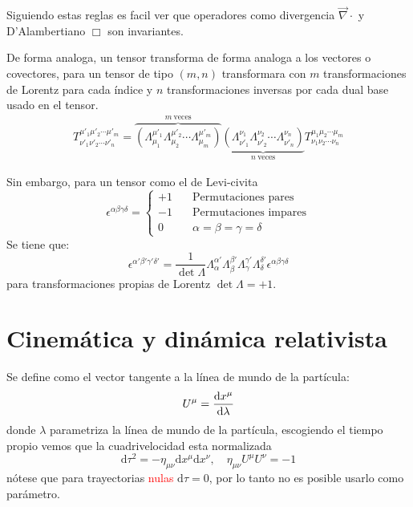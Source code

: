 \documentclass[../main]{subfiles}
\begin{document}
Siguiendo estas reglas es facil ver que operadores como divergencia $\vec{\nabla}\cdot$ y D'Alambertiano $\Box$ son invariantes.

De forma analoga, un tensor transforma de forma analoga a los vectores o covectores, para un tensor de tipo $(m, n)$ transformara con $m$ transformaciones de Lorentz para cada índice y $n$ transformaciones inversas por cada dual base usado en el tensor.
\begin{equation}
    \begin{split}
        T^{\mu'_1 \mu'_2 \cdots \mu'_m}_{\nu'_1 \nu'_2 \cdots \nu'_n}=\overbrace{\left(\Lambda^{\mu'_1}_{\mu_1} \Lambda^{\mu'_2}_{\mu_2}\cdots \Lambda^{\mu'_m}_{\mu_m}\right)}^{m \ \text{veces}} \underbrace{\left(\Lambda^{\nu_1}_{\nu'_1}\Lambda^{\nu_2}_{\nu'_2}\cdots \Lambda^{\nu_n}_{\nu'_n}\right)}_{n \ \text{veces}} T^{\mu_1\mu_2 \cdots \mu_m}_{\nu_1\nu_2\cdots \nu_n}
    \end{split}
\end{equation}

Sin embargo, para un tensor como el de Levi-civita
\begin{equation}
    \epsilon^{\alpha\beta\gamma\delta}=
    \left\{
    \begin{split}
        +1 &\quad \text{Permutaciones pares}\\
        -1 &\quad \text{Permutaciones impares}\\
        0  &\quad \alpha=\beta=\gamma=\delta
    \end{split}
    \right.
\end{equation}
Se tiene que:
\begin{equation}
    \epsilon^{\alpha' \beta' \gamma' \delta'}=\dfrac{1}{\det \Lambda} \Lambda^{\alpha'}_{\alpha} \Lambda^{\beta'}_{\beta} \Lambda^{\gamma'}_{\gamma} \Lambda^{\delta'}_{\delta}\epsilon^{\alpha\beta\gamma\delta}
\end{equation}
para transformaciones propias de Lorentz $\det \Lambda=+1$.

\section{Cinemática y dinámica relativista}
 Se define como el vector tangente a la línea de mundo de la partícula:
\begin{equation}
    U^{\mu}=\dv{x^{\mu}}{\lambda}
\end{equation}
donde $\lambda$ parametriza la línea de mundo de la partícula, escogiendo el tiempo propio vemos que la cuadrivelocidad esta normalizada
\begin{equation}
    \mathrm{d}\tau^2=-\eta_{\mu\nu} \mathrm{d}x^{\mu}\mathrm{d}x^{\nu},\quad \eta_{\mu\nu}U^{\mu}U^{\nu}=-1
\end{equation}
nótese que para trayectorias \textcolor{red}{nulas} $\mathrm{d}\tau=0$, por lo tanto no es posible usarlo como parámetro.
\end{document}
